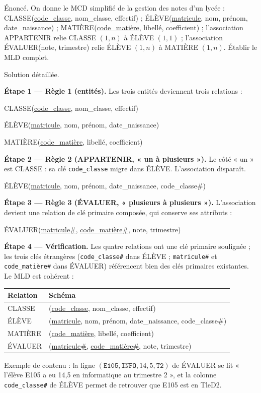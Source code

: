 \documentclass[11pt]{article}
\begin{document}
\begin{exoresolu}
Énoncé. On donne le MCD simplifié de la gestion des notes d'un lycée : CLASSE(\underline{code\_classe}, nom\_classe, effectif) ; ÉLÈVE(\underline{matricule}, nom, prénom, date\_naissance) ; MATIÈRE(\underline{code\_matière}, libellé, coefficient) ; l'association APPARTENIR relie CLASSE $(1,n)$ à ÉLÈVE $(1,1)$ ; l'association ÉVALUER(note, trimestre) relie ÉLÈVE $(1,n)$ à MATIÈRE $(1,n)$. Établir le MLD complet.

\tcblower
Solution détaillée.

\textbf{Étape 1 — Règle 1 (entités).} Les trois entités deviennent trois relations :

CLASSE(\underline{code\_classe}, nom\_classe, effectif)

ÉLÈVE(\underline{matricule}, nom, prénom, date\_naissance)

MATIÈRE(\underline{code\_matière}, libellé, coefficient)

\textbf{Étape 2 — Règle 2 (APPARTENIR, « un à plusieurs »).} Le côté « un » est CLASSE : sa clé \texttt{code\_classe} migre dans ÉLÈVE. L'association disparaît.

ÉLÈVE(\underline{matricule}, nom, prénom, date\_naissance, code\_classe\#)

\textbf{Étape 3 — Règle 3 (ÉVALUER, « plusieurs à plusieurs »).} L'association devient une relation de clé primaire composée, qui conserve ses attributs :

ÉVALUER(\underline{matricule\#}, \underline{code\_matière\#}, note, trimestre)

\textbf{Étape 4 — Vérification.} Les quatre relations ont une clé primaire soulignée ; les trois clés étrangères (\texttt{code\_classe\#} dans ÉLÈVE ; \texttt{matricule\#} et \texttt{code\_matière\#} dans ÉVALUER) référencent bien des clés primaires existantes. Le MLD est cohérent :

\begin{center}
\begin{tabularx}{\linewidth}{|l|X|}
\hline
\rowcolor{popblueL} \textbf{Relation} & \textbf{Schéma} \\
\hline
CLASSE & (\underline{code\_classe}, nom\_classe, effectif) \\
\hline
ÉLÈVE & (\underline{matricule}, nom, prénom, date\_naissance, code\_classe\#) \\
\hline
MATIÈRE & (\underline{code\_matière}, libellé, coefficient) \\
\hline
ÉVALUER & (\underline{matricule\#}, \underline{code\_matière\#}, note, trimestre) \\
\hline
\end{tabularx}
\end{center}

Exemple de contenu : la ligne $(\texttt{E105}, \texttt{INFO}, 14{,}5, \texttt{T2})$ de ÉVALUER se lit « l'élève E105 a eu 14,5 en informatique au trimestre 2 », et la colonne \texttt{code\_classe\#} de ÉLÈVE permet de retrouver que E105 est en TleD2.
\end{exoresolu}
\end{document}
